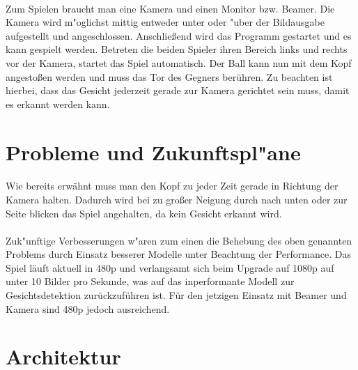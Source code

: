 \documentclass[12pt]{article}
\begin{document}
\paragraph{}
Zum Spielen braucht man eine Kamera und einen Monitor bzw. Beamer. Die Kamera
wird m"oglichst mittig entweder unter oder "uber der Bildausgabe aufgestellt und angeschlossen.
Anschließend wird das Programm gestartet und es kann gespielt werden.
Betreten die beiden Spieler ihren Bereich links und rechts vor der Kamera,
startet das Spiel automatisch. Der Ball kann nun mit dem Kopf angestoßen werden
und muss das Tor des Gegners berühren. Zu beachten ist hierbei, dass
das Gesicht jederzeit gerade zur Kamera gerichtet sein muss, damit es erkannt werden kann.
\section{Probleme und Zukunftspl"ane}
\paragraph{}
Wie bereits erwähnt muss man den Kopf zu jeder Zeit gerade in Richtung
der Kamera halten. Dadurch wird bei zu großer Neigung durch nach unten oder zur
Seite blicken das Spiel angehalten, da kein Gesicht erkannt wird.
\paragraph{}
Zuk"unftige Verbesserungen w"aren zum einen die Behebung des oben genannten Problems
durch Einsatz besserer Modelle unter Beachtung der Performance. Das Spiel läuft aktuell
in 480p und verlangsamt sich beim Upgrade auf 1080p auf unter 10 Bilder pro Sekunde,
was auf das inperformante Modell zur Gesichtsdetektion zurückzuführen ist.
Für den jetzigen Einsatz mit Beamer und Kamera sind 480p jedoch ausreichend.
\section{Architektur}
\end{document}
